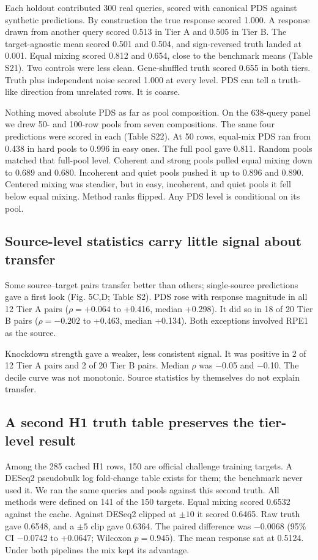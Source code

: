 \documentclass[12pt]{article}
\begin{document}
Each holdout contributed 300 real queries, scored with canonical PDS against synthetic predictions. By construction the true response scored 1.000. A response drawn from another query scored 0.513 in Tier A and 0.505 in Tier B. The target-agnostic mean scored 0.501 and 0.504, and sign-reversed truth landed at 0.001. Equal mixing scored 0.812 and 0.654, close to the benchmark means (Table S21). Two controls were less clean. Gene-shuffled truth scored 0.655 in both tiers. Truth plus independent noise scored 1.000 at every level. PDS can tell a truth-like direction from unrelated rows. It is coarse.

Nothing moved absolute PDS as far as pool composition. On the 638-query panel we drew 50- and 100-row pools from seven compositions. The same four predictions were scored in each (Table S22). At 50 rows, equal-mix PDS ran from 0.438 in hard pools to 0.996 in easy ones. The full pool gave 0.811. Random pools matched that full-pool level. Coherent and strong pools pulled equal mixing down to 0.689 and 0.680. Incoherent and quiet pools pushed it up to 0.896 and 0.890. Centered mixing was steadier, but in easy, incoherent, and quiet pools it fell below equal mixing. Method ranks flipped. Any PDS level is conditional on its pool.

\subsection{Source-level statistics carry little signal about transfer}

Some source–target pairs transfer better than others; single-source predictions gave a first look (Fig. 5C,D; Table S2). PDS rose with response magnitude in all 12 Tier A pairs ($\rho = +0.064$ to +0.416, median +0.298). It did so in 18 of 20 Tier B pairs ($\rho = -0.202$ to +0.463, median +0.134). Both exceptions involved RPE1 as the source.

Knockdown strength gave a weaker, less consistent signal. It was positive in 2 of 12 Tier A pairs and 2 of 20 Tier B pairs. Median $\rho$ was $-$0.05 and $-$0.10. The decile curve was not monotonic. Source statistics by themselves do not explain transfer.

\subsection{A second H1 truth table preserves the tier-level result}

Among the 285 cached H1 rows, 150 are official challenge training targets. A DESeq2 pseudobulk log fold-change table exists for them; the benchmark never used it. We ran the same queries and pools against this second truth. All methods were defined on 141 of the 150 targets. Equal mixing scored 0.6532 against the cache. Against DESeq2 clipped at $\pm 10$ it scored 0.6465. Raw truth gave 0.6548, and a $\pm 5$ clip gave 0.6364. The paired difference was $-$0.0068 (95\% CI $-$0.0742 to +0.0647; Wilcoxon $p = 0.945$). The mean response sat at 0.5124. Under both pipelines the mix kept its advantage.
\end{document}
